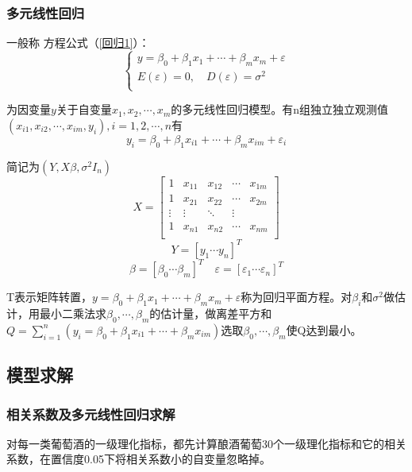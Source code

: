 \documentclass[withoutpreface,bwprint]{cumcmthesis} %
\begin{document}
\subsubsection{多元线性回归}

\par 一般称
方程公式（\ref{回归1}）：
\begin{equation}
\label{回归1}
\left\{
\begin{aligned}
y = \beta_0 + \beta_1x_1 + \cdots + \beta_mx_m + \varepsilon \\
E(\varepsilon) = 0, \quad D(\varepsilon) = \sigma^2\\
\end{aligned}
\right.
\end{equation}

为因变量$y$关于自变量$x_{1},x_{2},\cdots,x_{m}$的多元线性回归模型。有n组独立独立观测值$(x_{i1},x_{i2},\cdots,x_{im},y_i),i = 1,2,\cdots,n$有
$$
y_i = \beta_0 + \beta_1x_{i1} + \cdots + \beta_mx_{im} + \varepsilon_i
$$


简记为$(Y,X\beta,\sigma^2I_n)$
\begin{equation}
\label{X}
X = \begin{bmatrix}
1 & x_{11} & x_{12} & \cdots & x_{1m}\\
1 & x_{21} & x_{22} & \cdots & x_{2m}\\
\vdots & \vdots & \ddots & \vdots \\
1 & x_{n1} & x_{n2} & \cdots & x_{nm}\\
\end{bmatrix}
\end{equation}
\begin{equation}
\label{Y}
	Y = [y_1 \cdots y_n]^T
\end{equation}
\begin{equation}
	\beta = [\beta_0 \cdots \beta_m]^T \quad \varepsilon = [\varepsilon_1 \cdots \varepsilon_n]^T
\end{equation}

T表示矩阵转置，$y = \beta_0 + \beta_1x_1 + \cdots + \beta_mx_m + \varepsilon$称为回归平面方程。对$\beta_i$和$\sigma^2$做估计，用最小二乘法求$\beta_0,\cdots,\beta_m$的估计量，做离差平方和$Q = \sum\limits_{i=1}^n(y_i = \beta_0 + \beta_1x_{i1} + \cdots + \beta_mx_{im})$选取$\beta_0,\cdots,\beta_m$使Q达到最小。

\subsection{模型求解}
\subsubsection{相关系数及多元线性回归求解}
\par 对每一类葡萄酒的一级理化指标，都先计算酿酒葡萄30个一级理化指标和它的相关系数，在置信度0.05下将相关系数小的自变量忽略掉。
\end{document}
